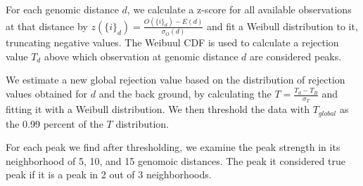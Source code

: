 \documentclass[12pt]{article}
\begin{document}
For each genomic distance $d$, we calculate a z-score for all available observations at that distance by $z({\{i\}_d})=\frac{O({\{i\}_d})-E(d)}{\sigma_{O}(d)}$ and fit a Weibull distribution to it, truncating negative values. The Weibuul CDF is used to calculate a rejection value $T_d$ above which observation at genomic distance $d$ are considered peaks. 

We estimate a new global rejection value based on the distribution of rejection values obtained for $d$ and the back ground, by calculating the $T = \frac{T_d-T_B}{\sigma_T}$ and fitting it with a Weibull distribution. We then threshold the data with $T_{global}$ as the 0.99 percent of the $T$  distribution. 

For each peak we find after thresholding, we examine the peak strength in its neighborhood of 5, 10, and 15 genomoic distances. The peak it considered true peak if it is a peak in 2 out of 3 neighborhoods. 
 
\end{document}
